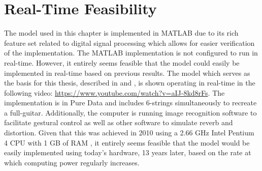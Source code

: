 \documentclass[../main.tex]{subfiles}
\begin{document}
\section{Real-Time Feasibility}
The model used in this chapter is implemented in MATLAB due to its rich feature set related to digital signal processing which allows for easier verification of the implementation. The MATLAB implementation is not configured to run in real-time. However, it entirely seems feasible that the model could easily be implemented in real-time based on previous results. The model which serves as the basis for this thesis, described in  and , is shown operating in real-time in the following video: \url{https://www.youtube.com/watch?v=aIJ-8kd8rFs}. The implementation is  in Pure Data and includes 6-strings simultaneously to recreate a full-guitar. Additionally, the computer is running image recognition software to facilitate gestural control as well as other software to simulate reverb and distortion. Given that this was achieved in 2010 using a 2.66 GHz Intel Pentium 4 CPU with 1 GB of RAM , it entirely seems feasible that the model would be easily implemented using today's hardware, 13 years later, based on the rate at which computing power regularly increases.
\end{document}
